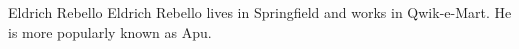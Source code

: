 \documentclass[journal]{IEEEtran}
\begin{document}


\begin{IEEEbiographynophoto}{Eldrich Rebello}
Eldrich Rebello lives in Springfield and works in Qwik-e-Mart. He is more popularly known as Apu.
\end{IEEEbiographynophoto}







\end{document}
